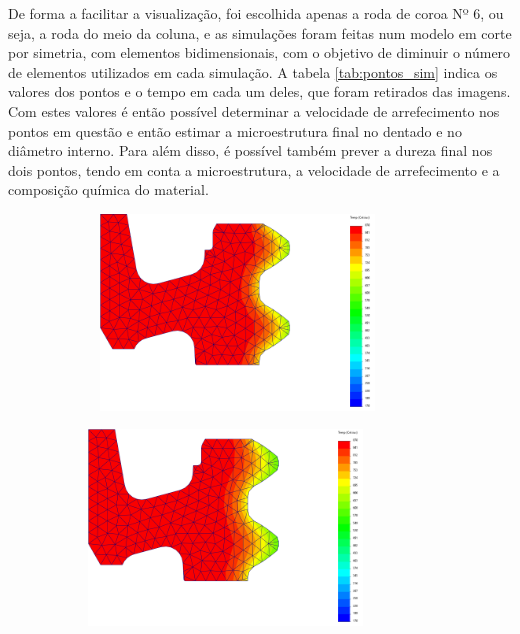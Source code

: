De forma a facilitar a visualização, foi escolhida apenas a roda de coroa Nº 6, ou seja, a roda do meio da coluna, e as simulações foram feitas num modelo em corte por simetria, com elementos bidimensionais, com o objetivo de diminuir o número de elementos utilizados em cada simulação. A tabela \ref{tab:pontos_sim} indica os valores dos pontos e o tempo em cada um deles, que foram retirados das imagens. Com estes valores é então possível determinar a velocidade de arrefecimento nos pontos em questão e então estimar a microestrutura final no dentado e no diâmetro interno. Para além disso, é possível também prever a dureza final nos dois pontos, tendo em conta a microestrutura, a velocidade de arrefecimento e a composição química do material.
\newpage
\begin{figure}[htb]
    \centering
    \begin{subfigure}{.33\textwidth}\
        \centering
        \includegraphics[width = 0.8\textwidth]{Figures/Cap4/AC3_Dentado.png}
        \caption[]%
        {}
        \label{fig:A3_Dent}
    \end{subfigure}%
    \begin{subfigure}{.33\textwidth}
        \centering
        \includegraphics[width = 0.8\textwidth]{Figures/Cap4/AC1_Dentado.png}

\end{subfigure}
\end{figure}
